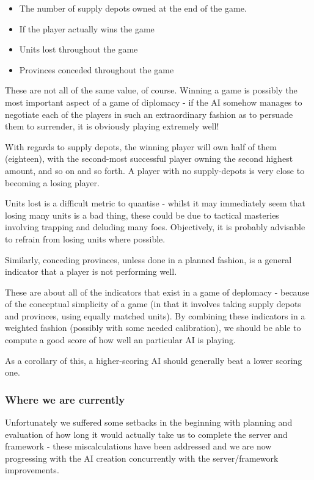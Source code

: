\documentclass[12pt]{article}
\begin{document}
\begin{itemize}
\item The number of supply depots owned at the end of the game.
\item If the player actually wins the game
\item Units lost throughout the game
\item Provinces conceded throughout the game
\end{itemize}

These are not all of the same value, of course. Winning a game is possibly the most important aspect of a game of diplomacy - if the AI somehow manages to negotiate each of the players in such an extraordinary fashion as to persuade them to surrender, it is obviously playing extremely well! 

With regards to supply depots, the winning player will own half of them (eighteen), with the second-most successful player owning the second highest amount, and so on and so forth. A player with no supply-depots is very close to becoming a losing player.

Units lost is a difficult metric to quantise - whilst it may immediately seem that losing many units is a bad thing, these could be due to tactical masteries involving trapping and deluding many foes. Objectively, it is probably advisable to refrain from losing units where possible.

Similarly, conceding provinces, unless done in a planned fashion, is a general indicator that a player is not performing well.

These are about all of the indicators that exist in a game of deplomacy - because of the conceptual simplicity of a game (in that it involves taking supply depots and provinces, using equally matched units). By combining these indicators in a weighted fashion (possibly with some needed calibration), we should be able to compute a good score of how well an particular AI is playing.

As a corollary of this, a higher-scoring AI should generally beat a lower scoring one.

\subsubsection{Where we are currently}
Unfortunately we suffered some setbacks in the beginning with planning and evaluation of how long it would actually take us to complete the server and framework - these miscalculations have been addressed and we are now progressing with the AI creation concurrently with the server/framework improvements. 
\end{document}
